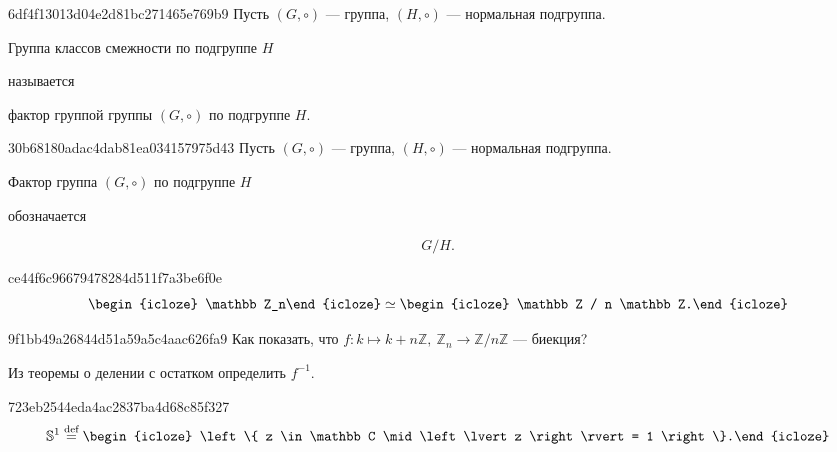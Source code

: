 \begin{note}{6df4f13013d04e2d81bc271465e769b9}
    Пусть \({ (G, \circ) }\) --- группа, \({ (H, \circ) }\) --- нормальная подгруппа.
    \begin{icloze}{2}Группа классов смежности по подгруппе \({ H }\)\end{icloze} называется \begin{icloze}{1}фактор группой группы \({ (G, \circ) }\) по подгруппе \({ H }\).\end{icloze}
\end{note}

\begin{note}{30b68180adac4dab81ea034157975d43}
    Пусть \({ (G, \circ) }\) --- группа, \({ (H, \circ) }\) --- нормальная подгруппа.
    \begin{icloze}{2}Фактор группа \({ (G, \circ) }\) по подгруппе \({ H }\)\end{icloze} обозначается
    \begin{icloze}{1}
        \[
            G / H.
        \]
    \end{icloze}
\end{note}

\begin{note}{ce44f6c96679478284d511f7a3be6f0e}
    \[
        \begin{icloze}{2}\mathbb Z_n\end{icloze} \simeq \begin{icloze}{1}\mathbb Z / n \mathbb Z.\end{icloze}
    \]
\end{note}

\begin{note}{9f1bb49a26844d51a59a5c4aac626fa9}
    Как показать, что \({ f : k \mapsto k + n \mathbb Z, \: \mathbb Z_n \to \mathbb Z / n \mathbb Z }\) --- биекция?

    \begin{cloze}{1}
        Из теоремы о делении с остатком определить \({ f^{-1} }\).
    \end{cloze}
\end{note}

\begin{note}{723eb2544eda4ac2837ba4d68c85f327}
    \[
        \mathbb S^1 \overset{\text{def}}= \begin{icloze}{1}\left\{ z \in \mathbb C \mid \left\lvert z \right\rvert = 1 \right\}.\end{icloze}
    \]
\end{note}


